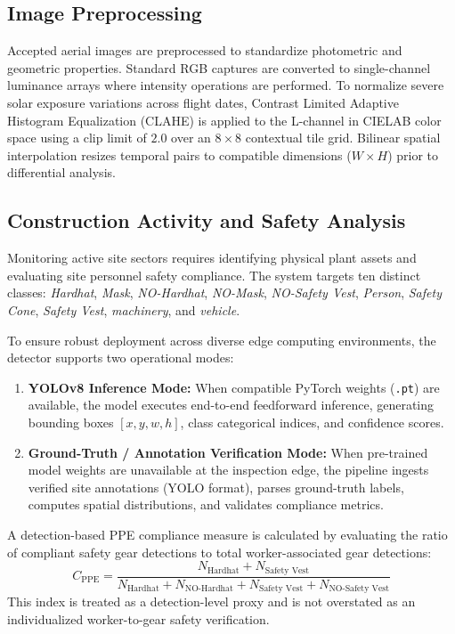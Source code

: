 \documentclass[conference]{IEEEtran}
\begin{document}
\subsection{Image Preprocessing}
Accepted aerial images are preprocessed to standardize photometric and geometric properties. Standard RGB captures are converted to single-channel luminance arrays where intensity operations are performed. To normalize severe solar exposure variations across flight dates, Contrast Limited Adaptive Histogram Equalization (CLAHE) \cite{zuiderveld1994contrast} is applied to the L-channel in CIELAB color space using a clip limit of $2.0$ over an $8 \times 8$ contextual tile grid. Bilinear spatial interpolation resizes temporal pairs to compatible dimensions ($W \times H$) prior to differential analysis.

\subsection{Construction Activity and Safety Analysis}
Monitoring active site sectors requires identifying physical plant assets and evaluating site personnel safety compliance. The system targets ten distinct classes: \textit{Hardhat}, \textit{Mask}, \textit{NO-Hardhat}, \textit{NO-Mask}, \textit{NO-Safety Vest}, \textit{Person}, \textit{Safety Cone}, \textit{Safety Vest}, \textit{machinery}, and \textit{vehicle}.

To ensure robust deployment across diverse edge computing environments, the detector supports two operational modes:
\begin{enumerate}
    \item \textbf{YOLOv8 Inference Mode:} When compatible PyTorch weights (\texttt{.pt}) are available, the model executes end-to-end feedforward inference, generating bounding boxes $[x, y, w, h]$, class categorical indices, and confidence scores.
    \item \textbf{Ground-Truth / Annotation Verification Mode:} When pre-trained model weights are unavailable at the inspection edge, the pipeline ingests verified site annotations (YOLO format), parses ground-truth labels, computes spatial distributions, and validates compliance metrics.
\end{enumerate}

A detection-based PPE compliance measure is calculated by evaluating the ratio of compliant safety gear detections to total worker-associated gear detections:
\begin{equation}
    C_{\text{PPE}} = \frac{N_{\text{Hardhat}} + N_{\text{Safety Vest}}}{N_{\text{Hardhat}} + N_{\text{NO-Hardhat}} + N_{\text{Safety Vest}} + N_{\text{NO-Safety Vest}}}
    \label{eq:ppe}
\end{equation}
This index is treated as a detection-level proxy and is not overstated as an individualized worker-to-gear safety verification.
\end{document}
